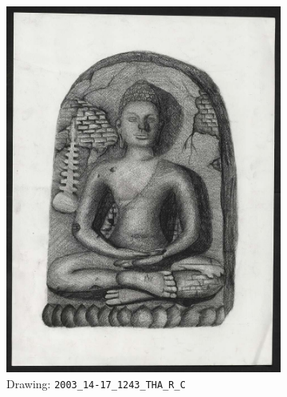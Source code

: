 \begin{figure}
     \centering
     \begin{subfigure}[b]{0.45\textwidth}
         \centering
         \includegraphics[width=\textwidth]{images/new_discoveries/2003_14-17_1243_THA_R_C.jpg}
         \caption{Drawing: \texttt{2003\_14-17\_1243\_THA\_R\_C}}
         \label{fig:2003_14-17_1243_THA_R_C}
     \end{subfigure}
     \hfill
     \begin{subfigure}[b]{0.45\textwidth}
         \centering

\end{subfigure}
\end{figure}
